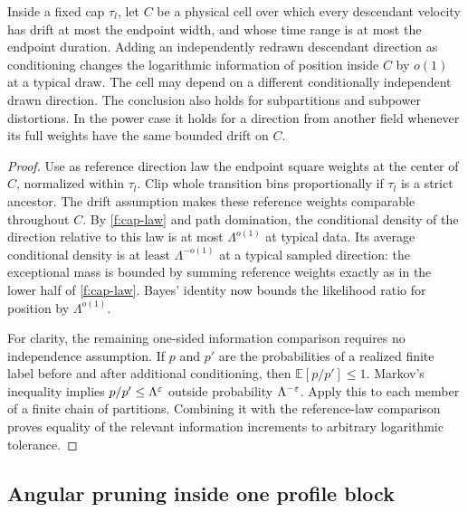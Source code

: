 \begin{lemma}\label{f:conditioning}
Inside a fixed cap $\tau_l$, let $C$ be a physical cell over which
every descendant velocity has drift at most the endpoint width, and
whose time range is at most the endpoint duration. Adding an
independently redrawn descendant direction as conditioning changes
the logarithmic information of position inside $C$ by $o(1)$ at a
typical draw. The cell may depend on a different conditionally
independent drawn direction. The conclusion also holds for
subpartitions and subpower distortions. In the power case it holds
for a direction from another field whenever its full weights have
the same bounded drift on $C$.
\end{lemma}

\begin{proof}
Use as reference direction law the endpoint square weights at the
center of $C$, normalized within $\tau_l$. Clip whole transition
bins proportionally if $\tau_l$ is a strict ancestor. The drift
assumption makes these reference weights comparable throughout $C$.
By \eqref{f:cap-law} and path domination, the conditional density of
the direction relative to this law is at most $\Lambda^{o(1)}$ at
typical data. Its average conditional density is at least
$\Lambda^{-o(1)}$ at a typical sampled direction: the exceptional
mass is bounded by summing reference weights exactly as in the
lower half of \eqref{f:cap-law}. Bayes' identity now bounds the
likelihood ratio for position by $\Lambda^{o(1)}$.

For clarity, the remaining one-sided information comparison requires
no independence assumption. If $p$ and $p'$ are the probabilities
of a realized finite label before and after additional conditioning,
then $\mathbb E[p/p']\le1$. Markov's inequality implies
$p/p'\le\Lambda^\varepsilon$ outside probability $\Lambda^{-\varepsilon}$.
Apply this to each member of a finite chain of partitions. Combining
it with the reference-law comparison proves equality of the relevant
information increments to arbitrary logarithmic tolerance.
\end{proof}

\subsection{Angular pruning inside one profile block}

